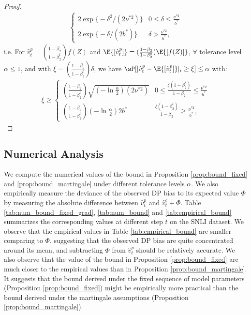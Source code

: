 \documentclass[letterpaper]{article} %
\begin{document}
\begin{proof}
\begin{align*}
    \begin{cases}
      2\exp{ \bigl\{ -\delta^2/(2\nu^{*2}) \bigl\} } & 0 \leq \delta \leq \frac{\nu^{*2}}{b^{*}} \\
      2\exp{ \bigl\{ -\delta/(2b^{*}) \bigl\} } & \delta > \frac{\nu^{*2}}{b^{*}},
   \end{cases}
\end{align*}
%
i.e. For $\hat{v}_t^p = (\frac{1-\beta_2}{1-\beta_2^t})f(Z)$ and $\E{[\hat{v}_t^p]} = (\frac{1-\beta_2}{1-\beta_2^t})\E{[f(Z)]}$, $\forall$ tolerance level $\alpha \leq 1$, and with $\xi = (\frac{1-\beta_2}{1-\beta_2^t}) \delta$, we have $\sP[\lvert \hat{v}_t^p - \E{[\hat{v}_t^p]} \rvert_i \geq \xi] \leq \alpha$ with:
\begin{align*}
    \xi \geq
    \begin{cases}
        (\frac{1-\beta_2}{1-\beta_2^t}) \sqrt{(-\ln{\frac{\alpha}{2}})(2\nu^{*2})}
        & 0 \leq \frac{\xi(1-\beta_2^t)}{1-\beta_2}  \leq \frac{\nu^{*2}}{b^{*}} \\
        (\frac{1-\beta_2}{1-\beta_2^t}) (-\ln{\frac{\alpha}{2}})2b^{*}
        & \frac{\xi(1-\beta_2^t)}{1-\beta_2}  \geq \frac{\nu^{*2}}{b^{*}},
    \end{cases}
\end{align*}
\end{proof}

\subsection{Numerical Analysis}\label{appendix:num-analysis}
We compute the numerical values of the bound in Proposition \ref{prop:bound_fixed} and \ref{prop:bound_martingale} under different tolerance levels $\alpha$. We also empirically measure the deviance of the observed DP bias to its expected value $\Phi$ by measuring the absolute difference between $\hat{v}_t^p$ and $\hat{v}_t^c + \Phi$. Table \ref{tab:num_bound_fixed_grad}, \ref{tab:num_bound} and \ref{tab:empirical_bound} summarizes the corresponding values at different step $t$ on the SNLI dataset. We observe that the empirical values in Table \ref{tab:empirical_bound} are smaller comparing to $\Phi$, suggesting that the observed DP bias are quite concentrated around its mean, and subtracting $\Phi$ from $\hat{v}_t^p$ should be relatively accurate. We also observe that the value of the bound in Proposition \ref{prop:bound_fixed} are much closer to the empirical values than in Proposition \ref{prop:bound_martingale}. It suggests that the bound derived under the fixed sequence of model parameters (Proposition \ref{prop:bound_fixed}) might be empirically more practical than the bound derived under the martingale assumptions (Proposition \ref{prop:bound_martingale}).
\end{document}
